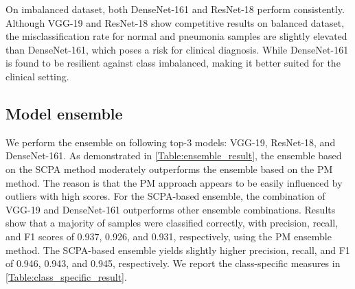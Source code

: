 \documentclass[conference]{IEEEtran}
\begin{document}
On imbalanced dataset, both DenseNet-161 and ResNet-18 perform consistently. Although VGG-19 and ResNet-18 show competitive results on balanced dataset, the misclassification rate for normal and pneumonia samples are slightly elevated than DenseNet-161, which poses a risk for clinical diagnosis. 
While DenseNet-161 is found to be resilient against class imbalanced, making it better suited for the clinical setting. %

\subsection{Model ensemble}
\label{model_ensemble}
We perform the ensemble on following top-3 models: VGG-19, ResNet-18, and DenseNet-161. %
As demonstrated in \cref{Table:ensemble_result}, the ensemble based on the SCPA method moderately outperforms the ensemble based on the PM method. The reason is that the PM approach appears to be easily influenced by outliers with high scores. %
For the SCPA-based ensemble, the combination of VGG-19  and DenseNet-161 outperforms other ensemble combinations. Results show that a majority of samples were classified correctly, with precision, recall, and F1 scores of 0.937, 0.926, and 0.931, respectively, using the PM ensemble method.
The SCPA-based ensemble yields slightly higher precision, recall, and F1 of 0.946, 0.943, and 0.945, respectively. We report the class-specific measures in \cref{Table:class_specific_result}. %
\end{document}
